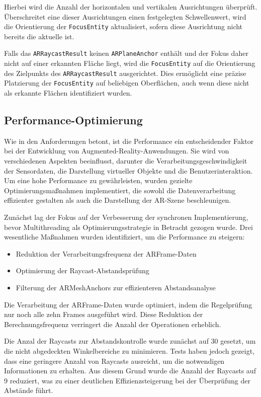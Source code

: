 Hierbei wird die Anzahl der horizontalen und vertikalen Ausrichtungen überprüft. Überschreitet eine dieser Ausrichtungen einen festgelegten Schwellenwert, wird die Orientierung der \texttt{FocusEntity} aktualisiert, sofern diese Ausrichtung nicht bereits die aktuelle ist.

Falls das \texttt{ARRaycastResult} keinen \texttt{ARPlaneAnchor} enthält und der Fokus daher nicht auf einer erkannten Fläche liegt, wird die \texttt{FocusEntity} auf die Orientierung des Zielpunkts des \texttt{ARRaycastResult} ausgerichtet. Dies ermöglicht eine präzise Platzierung der \texttt{FocusEntity} auf beliebigen Oberflächen, auch wenn diese nicht als erkannte Flächen identifiziert wurden.

\subsection{Performance-Optimierung}

Wie in den Anforderungen betont, ist die Performance ein entscheidender Faktor bei der Entwicklung von Augmented-Reality-Anwendungen. Sie wird von verschiedenen Aspekten beeinflusst, darunter die Verarbeitungsgeschwindigkeit der Sensordaten, die Darstellung virtueller Objekte und die Benutzerinteraktion. Um eine hohe Performance zu gewährleisten, wurden gezielte Optimierungsmaßnahmen implementiert, die sowohl die Datenverarbeitung effizienter gestalten als auch die Darstellung der AR-Szene beschleunigen.

Zunächst lag der Fokus auf der Verbesserung der synchronen Implementierung, bevor Multithreading als Optimierungsstrategie in Betracht gezogen wurde. Drei wesentliche Maßnahmen wurden identifiziert, um die Performance zu steigern:

\begin{itemize}
\item Reduktion der Verarbeitungsfrequenz der ARFrame-Daten
\item Optimierung der Raycast-Abstandsprüfung
\item Filterung der ARMeshAnchors zur effizienteren Abstandsanalyse
\end{itemize}

Die Verarbeitung der ARFrame-Daten wurde optimiert, indem die Regelprüfung nur noch alle zehn Frames ausgeführt wird. Diese Reduktion der Berechnungsfrequenz verringert die Anzahl der Operationen erheblich.

Die Anzal der Raycasts zur Abstandskontrolle wurde zunächst auf 30 gesetzt, um die nicht abgedeckten Winkelbereiche zu minimieren. Tests haben jedoch gezeigt, dass eine geringere Anzahl von Raycasts ausreicht, um die notwendigen Informationen zu erhalten. Aus diesem Grund wurde die Anzahl der Raycasts auf 9 reduziert, was zu einer deutlichen Effizienzsteigerung bei der Überprüfung der Abstände führt.

